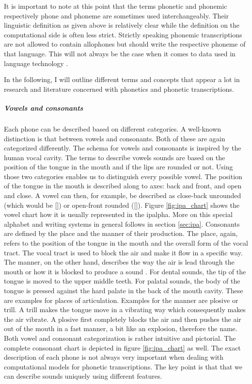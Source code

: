 It is important to note at this point that the terms phonetic and phonemic respectively phone and phoneme are sometimes used interchangeably. Their linguistic definition as given above is relatively clear while the definition on the computational side is often less strict. Strictly speaking phonemic transcriptions are not allowed to contain allophones but should write the respective phoneme of that language. This will not always be the case when it comes to data used in language technology \citep{Lee&Ashby.2020}. 

In the following, I will outline different terms and concepts that appear a lot in research and literature concerned with phonetics and phonetic transcriptions.

\subparagraph{Vowels and consonants} Each phone can be described based on different categories. A well-known distinction is that between vowels and consonants. Both of these are again categorized differently. The schema for vowels and consonants is inspired by the human vocal cavity. The terms to describe vowels sounds are based on the position of the tongue in the mouth and if the lips are rounded or not. Using those two categories enables us to distinguish every possible vowel. The position of the tongue in the mouth is described along to axes: back and front, and open and close. A vowel can then, for example, be described as close-back unrounded (which would be []) or open-front rounded ([\ipa{\OE}]). Figure \ref{fig:ipa_chart} shows the vowel chart how it is usually represented in the \ac{ipalpha}. More on this special alphabet and writing systems in general follows in section \ref{sec:ipa}. Consonants are defined by the place and the manner of their production. The place, again, refers to the position of the tongue in the mouth and the overall form of the vocal tract. The vocal tract is used to block the air and make it flow in a specific way. The manner, on the other hand, describes the way the air is lead through the mouth or how it is blocked to produce a sound \citep{phonetics-video}. For dental sounds, the tip of the tongue is moved to the upper middle teeth. For palatal sounds, the body of the tongue is pressed against the hard palate in the back of the mouth cavity. These are examples for places of articulation. Examples for the manner are plosive or trill. A trill makes the tongue move in a vibrating way which consequently makes the air vibrate. A plosive first completely blocks the air and then pushes the air out of the mouth in a fast manner, a bit like an explosion, therefore the name. Both vowel and consonant categorization is rather intuitive and pictorial. The complete consonant chart is depicted in figure \ref{fig:ipa_chart} as well. The exact description of each phone is not always very important when dealing with computational models for phonetic transcriptions. The key point is that that we can describe sounds uniquely using different features. 

